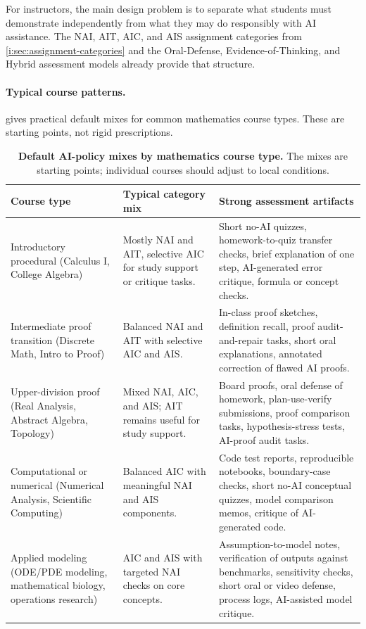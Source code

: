 \documentclass{SIAMbook2023}
\begin{document}
For instructors, the main design problem is to separate what students must demonstrate independently from what they may do responsibly with AI assistance. The NAI, AIT, AIC, and AIS assignment categories from \cref{i:sec:assignment-categories} and the Oral-Defense, Evidence-of-Thinking, and Hybrid assessment models already provide that structure.

\paragraph{Typical course patterns.}
 gives practical default mixes for common mathematics course types. These are starting points, not rigid prescriptions.

\begin{table}[ht]
\centering
\caption{\textbf{Default AI-policy mixes by mathematics course type.} The mixes are starting points; individual courses should adjust to local conditions.}
\label{tab:math-course-types}
\begin{tabularx}{\textwidth}{X X X}
\toprule
\textbf{Course type} & \textbf{Typical category mix} & \textbf{Strong assessment artifacts} \\
\midrule
Introductory procedural (Calculus I, College Algebra) & Mostly NAI and AIT, selective AIC for study support or critique tasks. & Short no-AI quizzes, homework-to-quiz transfer checks, brief explanation of one step, AI-generated error critique, formula or concept checks. \\
\addlinespace
Intermediate proof transition (Discrete Math, Intro to Proof) & Balanced NAI and AIT with selective AIC and AIS. & In-class proof sketches, definition recall, proof audit-and-repair tasks, short oral explanations, annotated correction of flawed AI proofs. \\
\addlinespace
Upper-division proof (Real Analysis, Abstract Algebra, Topology) & Mixed NAI, AIC, and AIS; AIT remains useful for study support. & Board proofs, oral defense of homework, plan-use-verify submissions, proof comparison tasks, hypothesis-stress tests, AI-proof audit tasks. \\
\addlinespace
Computational or numerical (Numerical Analysis, Scientific Computing) & Balanced AIC with meaningful NAI and AIS components. & Code test reports, reproducible notebooks, boundary-case checks, short no-AI conceptual quizzes, model comparison memos, critique of AI-generated code. \\
\addlinespace
Applied modeling (ODE/PDE modeling, mathematical biology, operations research) & AIC and AIS with targeted NAI checks on core concepts. & Assumption-to-model notes, verification of outputs against benchmarks, sensitivity checks, short oral or video defense, process logs, AI-assisted model critique. \\

\end{tabularx}
\end{table}
\end{document}
